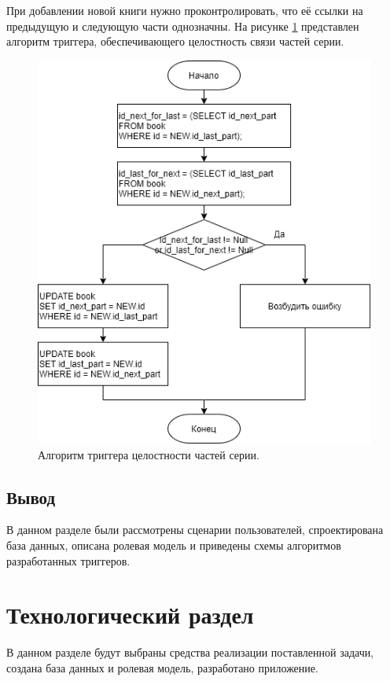При добавлении новой книги нужно проконтролировать, что её ссылки на предыдущую и следующую части однозначны. На рисунке \ref{img:parts_connect_trigger} представлен алгоритм триггера, обеспечивающего целостность связи частей серии.

\begin{figure}[h!]
	\centering
	\includegraphics[scale=0.9]{img/parts_connect_trigger.png}
	\caption{Алгоритм триггера целостности частей серии.}
	\label{img:parts_connect_trigger}
\end{figure}
\newpage

\subsection{Вывод}
В данном разделе были рассмотрены сценарии пользователей, спроектирована база данных, описана ролевая модель и приведены схемы алгоритмов разработанных триггеров.

\newpage
\section{Технологический раздел}
В данном разделе будут выбраны средства реализации поставленной задачи, создана база данных и ролевая модель, разработано приложение.
